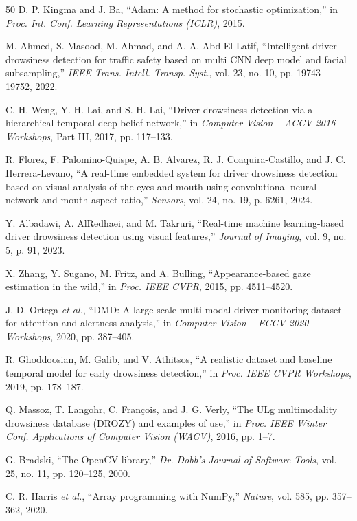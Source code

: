 \documentclass[conference]{IEEEtran}
\begin{document}
\begin{thebibliography}{50}
D. P. Kingma and J. Ba, ``Adam: A method for stochastic optimization,'' in \emph{Proc. Int. Conf. Learning Representations (ICLR)}, 2015.

M. Ahmed, S. Masood, M. Ahmad, and A. A. Abd El-Latif, ``Intelligent driver drowsiness detection for traffic safety based on multi CNN deep model and facial subsampling,'' \emph{IEEE Trans. Intell. Transp. Syst.}, vol. 23, no. 10, pp. 19743--19752, 2022.

C.-H. Weng, Y.-H. Lai, and S.-H. Lai, ``Driver drowsiness detection via a hierarchical temporal deep belief network,'' in \emph{Computer Vision -- ACCV 2016 Workshops}, Part III, 2017, pp. 117--133.

R. Florez, F. Palomino-Quispe, A. B. Alvarez, R. J. Coaquira-Castillo, and J. C. Herrera-Levano, ``A real-time embedded system for driver drowsiness detection based on visual analysis of the eyes and mouth using convolutional neural network and mouth aspect ratio,'' \emph{Sensors}, vol. 24, no. 19, p. 6261, 2024.

Y. Albadawi, A. AlRedhaei, and M. Takruri, ``Real-time machine learning-based driver drowsiness detection using visual features,'' \emph{Journal of Imaging}, vol. 9, no. 5, p. 91, 2023.

X. Zhang, Y. Sugano, M. Fritz, and A. Bulling, ``Appearance-based gaze estimation in the wild,'' in \emph{Proc. IEEE CVPR}, 2015, pp. 4511--4520.

J. D. Ortega \emph{et al.}, ``DMD: A large-scale multi-modal driver monitoring dataset for attention and alertness analysis,'' in \emph{Computer Vision -- ECCV 2020 Workshops}, 2020, pp. 387--405.

R. Ghoddoosian, M. Galib, and V. Athitsos, ``A realistic dataset and baseline temporal model for early drowsiness detection,'' in \emph{Proc. IEEE CVPR Workshops}, 2019, pp. 178--187.

Q. Massoz, T. Langohr, C. Fran\c{c}ois, and J. G. Verly, ``The ULg multimodality drowsiness database (DROZY) and examples of use,'' in \emph{Proc. IEEE Winter Conf. Applications of Computer Vision (WACV)}, 2016, pp. 1--7.

G. Bradski, ``The OpenCV library,'' \emph{Dr. Dobb's Journal of Software Tools}, vol. 25, no. 11, pp. 120--125, 2000.

C. R. Harris \emph{et al.}, ``Array programming with NumPy,'' \emph{Nature}, vol. 585, pp. 357--362, 2020.

\end{thebibliography}

\balance
\end{document}
